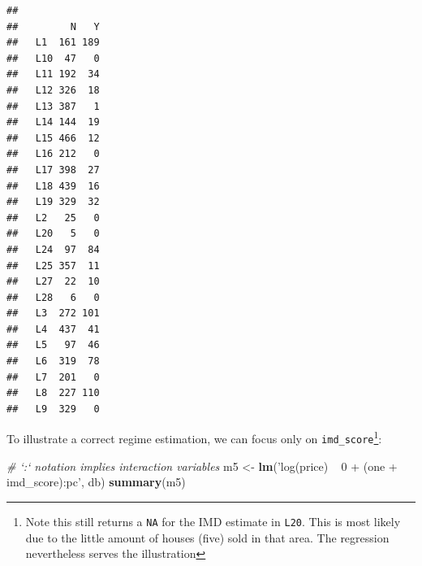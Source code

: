 \documentclass[]{book}
\newenvironment{Shaded}{\begin{snugshade}}{\end{snugshade}}
\newcommand{\KeywordTok}[1]{\textcolor[rgb]{0.13,0.29,0.53}{\textbf{#1}}}
\newcommand{\StringTok}[1]{\textcolor[rgb]{0.31,0.60,0.02}{#1}}
\newcommand{\CommentTok}[1]{\textcolor[rgb]{0.56,0.35,0.01}{\textit{#1}}}
\newcommand{\OperatorTok}[1]{\textcolor[rgb]{0.81,0.36,0.00}{\textbf{#1}}}
\newcommand{\NormalTok}[1]{#1}
\begin{document}
\begin{Shaded}
\end{Shaded}

\begin{verbatim}
##      
##         N   Y
##   L1  161 189
##   L10  47   0
##   L11 192  34
##   L12 326  18
##   L13 387   1
##   L14 144  19
##   L15 466  12
##   L16 212   0
##   L17 398  27
##   L18 439  16
##   L19 329  32
##   L2   25   0
##   L20   5   0
##   L24  97  84
##   L25 357  11
##   L27  22  10
##   L28   6   0
##   L3  272 101
##   L4  437  41
##   L5   97  46
##   L6  319  78
##   L7  201   0
##   L8  227 110
##   L9  329   0
\end{verbatim}

To illustrate a correct regime estimation, we can focus only on
\texttt{imd\_score}\footnote{Note this still returns a \texttt{NA} for
  the IMD estimate in \texttt{L20}. This is most likely due to the
  little amount of houses (five) sold in that area. The regression
  nevertheless serves the illustration}:

\begin{Shaded}
\begin{Highlighting}[]
\CommentTok{# `:` notation implies interaction variables}
\NormalTok{m5 <-}\StringTok{ }\KeywordTok{lm}\NormalTok{(}\StringTok{'log(price) ~ 0 + (one + imd_score):pc'}\NormalTok{, db)}
\KeywordTok{summary}\NormalTok{(m5)}
\end{Highlighting}
\end{Shaded}
\end{document}
